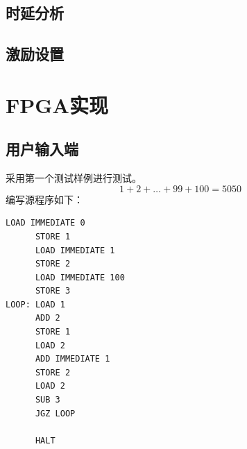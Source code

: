 \documentclass[lang=cn,a4paper,newtx]{elegantpaper}
\begin{document}
\subsection{时延分析}

\subsection{激励设置}

\section{FPGA实现}
\subsection{用户输入端}
采用第一个测试样例进行测试。
$$
1+2+\dots +99 +100 =5050
$$
编写源程序如下：
\begin{lstlisting}[language=Assembly]
      LOAD IMMEDIATE 0 
      STORE 1
      LOAD IMMEDIATE 1
      STORE 2
      LOAD IMMEDIATE 100
      STORE 3
LOOP: LOAD 1
      ADD 2
      STORE 1
      LOAD 2
      ADD IMMEDIATE 1
      STORE 2
      LOAD 2
      SUB 3
      JGZ LOOP

      HALT
\end{lstlisting}
\nocite{FPGA-CPU}
\newpage
\printbibliography
\newpage
\addappheadtotoc
\end{document}
